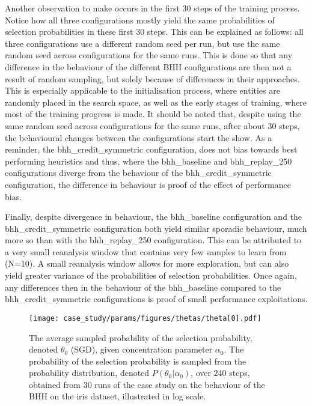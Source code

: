 Another observation to make occurs in the first 30 steps of the training process. Notice how all three configurations mostly yield the same probabilities of selection probabilities in these first 30 steps. This can be explained as follows: all three configurations use a different random seed per run, but use the same random seed across configurations for the same runs. This is done so that any difference in the behaviour of the different \acs{BHH} configurations are then not a result of random sampling, but solely because of differences in their approaches. This is especially applicable to the initialisation process, where entities are randomly placed in the search space, as well as the early stages of training, where most of the training progress is made. It should be noted that, despite using the same random seed across configurations for the same runs, after about 30 steps, the behavioural changes between the configurations start the show. As a reminder, the bhh\_credit\_symmetric configuration, does not bias towards best performing heuristics and thus, where the bhh\_baseline and bhh\_replay\_250 configurations diverge from the behaviour of the bhh\_credit\_symmetric configuration, the difference in behaviour is proof of the effect of performance bias.

Finally, despite divergence in behaviour, the bhh\_baseline configuration and the bhh\_credit\_symmetric configuration both yield similar sporadic behaviour, much more so than with the bhh\_replay\_250 configuration. This can be attributed to a very small reanalysis window that contains very few samples to learn from (N=10). A small reanalysis window allows for more exploration, but can also yield greater variance of the probabilities of selection probabilities. Once again, any differences then in the behaviour of the  bhh\_baseline compared to the bhh\_credit\_symmetric configurations is proof of small performance exploitations.

\begin{figure}[htpb]
	\centering
	\texttt{[image: case\_study/params/figures/thetas/theta[0].pdf]}
	\caption{The average sampled probability of the selection probability, denoted $\theta_{0}$ (\acs{SGD}), given concentration parameter $\alpha_{0}$. The probability of the selection probability is sampled from the probability distribution, denoted $P(\theta_{0} \vert \alpha_{0})$, over 240 steps, obtained from 30 runs of the case study on the behaviour of the \acs{BHH} on the iris dataset, illustrated in log scale.}
	\label{fig:results:case_study:theta:0}
\end{figure}


